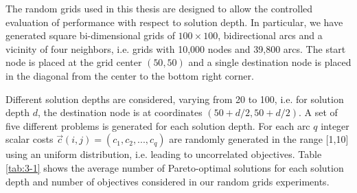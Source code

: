 The random grids used in this thesis are designed to allow the controlled evaluation of performance with respect to solution depth. In particular, we have generated square bi-dimensional grids of $100 \times 100$, bidirectional arcs and a vicinity of four neighbors, i.e. grids with 10,000 nodes and 39,800 arcs. The start node is placed at the grid center $(50,50)$ and a single destination node is placed in the diagonal from the center to the bottom right corner. 

Different solution depths are considered, varying from 20 to 100, i.e. for solution depth $d$, the destination node is at coordinates $(50 + d/2, 50 + d/2)$. A set of five different problems is generated for each solution depth. For each arc $q$ integer scalar costs $\vec c(i,j) = (c_1,c_2,...,c_q)$ are randomly generated in the range [1,10] using an uniform distribution, i.e. leading to uncorrelated objectives. Table \ref{tab:3-1} shows the average number of Pareto-optimal solutions for each solution depth and number of objectives considered in our random grids experiments. 

\begin{table}
\caption{Average number of Pareto-optimal cost vectors relative to solution depth and number of objectives ($q$) in our grid problems.}
\centering
{}
\label{tab:3-1}
\end{table}

